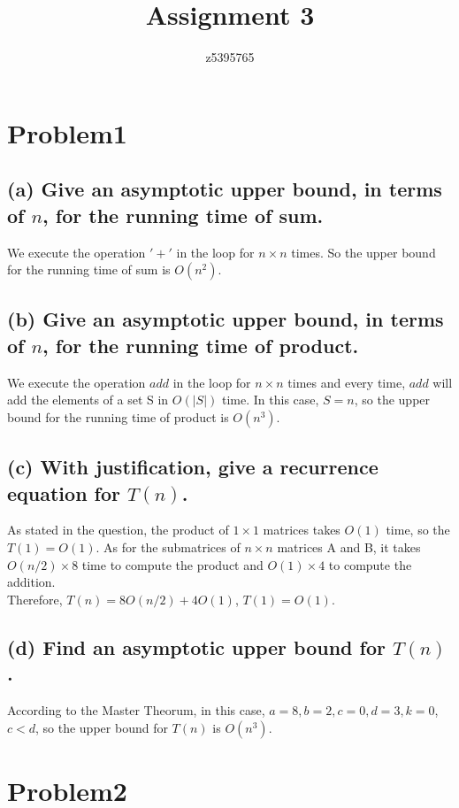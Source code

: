 \documentclass[]{article}
\title{Assignment 3}
\author{z5395765}
\begin{document}
	\maketitle
	
	\begin{spacing}{1.5}
		
		\section*{Problem1}
		\subsection*{(a) Give an asymptotic upper bound, in terms of $ n $, for the running time of sum.}
		We execute the operation $ '+' $ in the loop for $ n \times n $ times. So the upper bound for the running time of sum is $ O(n^2) $.
		\subsection*{(b) Give an asymptotic upper bound, in terms of $ n $, for the running time of product.}
		We execute the operation $ add $ in the loop for $ n \times n $ times and every time, $ add $ will add the elements of a set S in $ O(|S|) $ time.  In this case, $ S = n $, so the upper bound for the running time of product is $ O(n^3) $.
		\subsection*{(c) With justification, give a recurrence equation for $ T(n) $.}
		As stated in the question, the product of $ 1 \times 1 $ matrices takes $ O(1) $ time, so the $ T(1) = O(1) $. As for the submatrices of $ n \times n $ matrices A and B, it takes $ O(n/2) \times 8 $ time to compute the product  and $ O(1) \times 4 $ to compute the addition.\\
		Therefore, $ T(n) = 8O(n/2) + 4O(1)$, $ T(1) = O(1) $. 
		\subsection*{(d) Find an asymptotic upper bound for $ T(n) $.}
		According to the Master Theorum, in this case, $ a = 8, b = 2, c = 0, d= 3, k=0 $, $ c<d $, so the upper bound for $ T(n) $ is $ O(n^3) $.
		
		\section*{Problem2}

\end{spacing}
\end{document}
